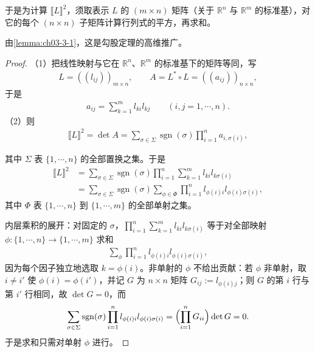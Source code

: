 \documentclass[../../main.tex]{subfiles}%
\begin{document}
\begin{remark}\label{remark:ch03-thm-3-7-子式}
于是为计算 $\llbracket L\rrbracket^2$，须取表示 $L$ 的 $(m\times n)$ 矩阵（关于 $\mathbb{R}^n$ 与 $\mathbb{R}^m$ 的标准基），对它的每个 $(n\times n)$ 子矩阵计算行列式的平方，再求和。

由\cref{lemma:ch03-3-1}，这是勾股定理的高维推广。%
\end{remark}

\begin{proof}
（1）把线性映射与它在 $\mathbb{R}^n$、$\mathbb{R}^m$ 的标准基下的矩阵等同，写
\begin{align*}
L=((l_{ij}))_{m\times n},\qquad A=L^*\circ L=((a_{ij}))_{n\times n},
\end{align*}
于是
\begin{align*}
a_{ij}=\sum_{k=1}^ml_{ki}l_{kj}\qquad(i,j=1,\cdots,n).
\end{align*}
（2）则
\begin{align*}
\llbracket L\rrbracket^2=\det A=\sum_{\sigma\in\Sigma}\operatorname{sgn}(\sigma)\prod_{i=1}^na_{i,\sigma(i)},
\end{align*}


其中 $\Sigma$ 表 $\{1,\cdots,n\}$ 的全部置换之集。于是
\begin{align*}
\llbracket L\rrbracket^2
&=\sum_{\sigma\in\Sigma}\operatorname{sgn}(\sigma)\prod_{i=1}^n\sum_{k=1}^ml_{ki}l_{k\sigma(i)}\\
&=\sum_{\sigma\in\Sigma}\operatorname{sgn}(\sigma)\sum_{\phi\in\Phi}\prod_{i=1}^nl_{\phi(i)i}l_{\phi(i)\sigma(i)},
\end{align*}
其中 $\Phi$ 表 $\{1,\cdots,n\}$ 到 $\{1,\cdots,m\}$ 的全部单射之集。

内层乘积的展开：对固定的 $\sigma$，$\prod_{i=1}^n\sum_{k=1}^ml_{ki}l_{k\sigma(i)}$ 等于对全部映射 $\phi:\{1,\cdots,n\}\to\{1,\cdots,m\}$ 求和
\begin{align*}
\sum_{\phi}\prod_{i=1}^nl_{\phi(i)i}l_{\phi(i)\sigma(i)},
\end{align*}
因为每个因子独立地选取 $k=\phi(i)$。非单射的 $\phi$ 不给出贡献：若 $\phi$ 非单射，取 $i\neq i'$ 使 $\phi(i)=\phi(i')$，并记 $G$ 为 $n\times n$ 矩阵 $G_{ij}:=l_{\phi(i)j}$；则 $G$ 的第 $i$ 行与第 $i'$ 行相同，故 $\det G=0$，而
\begin{align*}
\sum_{\sigma\in\Sigma}\operatorname{sgn}(\sigma)\prod_{i=1}^nl_{\phi(i)i}l_{\phi(i)\sigma(i)}
=\Bigl(\prod_{i=1}^nG_{ii}\Bigr)\det G=0 .
\end{align*}
于是求和只需对单射 $\phi$ 进行。


\end{proof}
\end{document}
